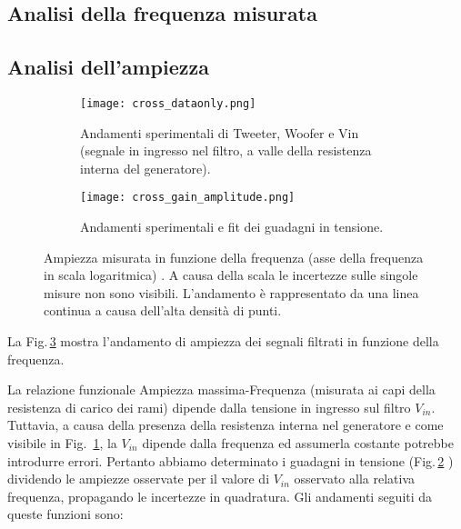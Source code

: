 \documentclass[../Relazione_circuiti]{subfiles}
\begin{document}
\subsection{Analisi della frequenza misurata}

\subsection{Analisi dell'ampiezza}

  \begin{figure}[H]
    \centering

    \begin{subfigure}[t]{=0.49\textwidth}

      \texttt{[image: cross\_dataonly.png]}

      \caption{Andamenti sperimentali di Tweeter, Woofer e Vin (segnale in ingresso nel filtro,
        a valle della resistenza interna del generatore).}
      \label{fig: amplitude_dataonly}

    \end{subfigure}
    \hfill
    \begin{subfigure}[t]{=0.49\textwidth}

      \texttt{[image: cross\_gain\_amplitude.png]}

      \caption
      {Andamenti sperimentali e fit dei guadagni in tensione.}
      \label{fig:cross_gain}
    \end{subfigure}

    \caption{Ampiezza misurata in funzione della frequenza (asse della frequenza in scala logaritmica)
      . A causa della scala le incertezze sulle singole misure non sono visibili. L'andamento è rappresentato da una
      linea continua a causa dell'alta densità di punti.}
    \label{fig:cross_amplitude}

  \end{figure}

  La Fig.\,\ref{fig:cross_amplitude} mostra l'andamento di ampiezza dei segnali filtrati in funzione della frequenza.

  La relazione funzionale Ampiezza massima-Frequenza (misurata ai capi della resistenza di carico dei rami) dipende
  dalla tensione in ingresso sul filtro $V_{in}$.
  Tuttavia, a causa della presenza della resistenza interna nel generatore e come visibile in Fig.
  \,\ref{fig: amplitude_dataonly}, la $V_{in}$
  dipende dalla frequenza ed assumerla costante potrebbe introdurre errori.
  Pertanto abbiamo determinato i guadagni in tensione (Fig.\,\ref{fig:cross_gain}
  ) dividendo le ampiezze osservate per il valore di $V_{in}$
  osservato alla relativa frequenza, propagando le incertezze in quadratura. Gli andamenti seguiti da queste funzioni
  sono:
\end{document}
